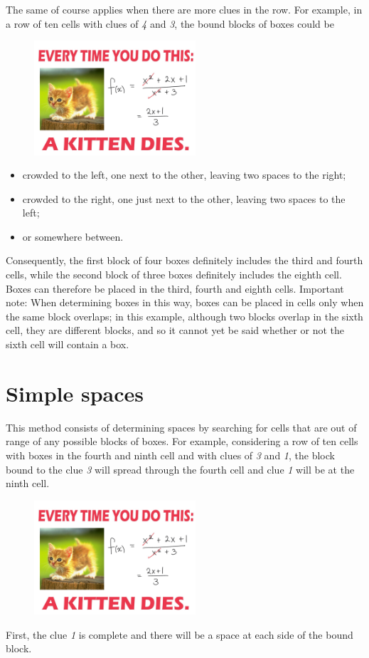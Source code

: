 The same of course applies when there are more clues in the row. For example, in a row of ten cells with clues of \textit{4} and \textit{3}, the bound blocks of boxes could be
\begin{figure}
\centering
\includegraphics[width=6cm]{picture/obr.jpg}
\end{figure}

\begin{itemize} 
 \item {crowded to the left, one next to the other, leaving two spaces to the right;}

\item {crowded to the right, one just next to the other, leaving two spaces to the left;}

\item {or somewhere between.} 
\end{itemize}

Consequently, the first block of four boxes definitely includes the third and fourth cells, while the second block of three boxes definitely includes the eighth cell. Boxes can therefore be placed in the third, fourth and eighth cells. Important note: When determining boxes in this way, boxes can be placed in cells only when the same block overlaps; in this example, although two blocks overlap in the sixth cell, they are different blocks, and so it cannot yet be said whether or not the sixth cell will contain a box.


\section{Simple spaces}
This method consists of determining spaces by searching for cells that are out of range of any possible blocks of boxes. For example, considering a row of ten cells with boxes in the fourth and ninth cell and with clues of \textit{3} and \textit{1}, the block bound to the clue \textit{3} will spread through the fourth cell and clue \textit{1} will be at the ninth cell.
\begin{figure}
\centering
\includegraphics[width=6cm]{picture/obr.jpg}
\end{figure}
First, the clue \textit{1} is complete and there will be a space at each side of the bound block.

